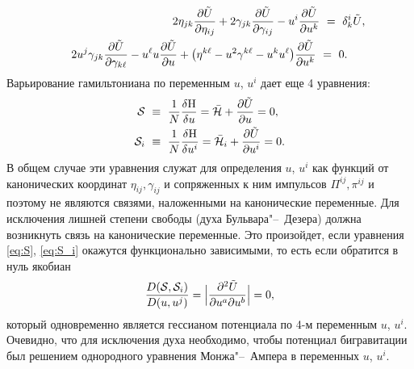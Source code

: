 \begin{gather}
\hspace{3.7cm}
 2\eta_{jk}\frac{\partial\tilde{U}}{\partial\eta_{ij}}+2\gamma_{jk}\frac{\partial\tilde{U}}{\partial\gamma_{ij}}-u^i\frac{\partial\tilde{U}}{\partial u^k}~=~\delta^i_k\tilde{U},%
 \\
 2u^j\gamma_{jk}\frac{\partial\tilde{U}}{\partial\gamma_{k\ell}}-u^\ell u\frac{\partial\tilde{U}}{\partial u}+\bigl(\eta^{k\ell}-u^2\gamma^{k\ell}-u^k u^\ell \bigr)\frac{\partial\tilde{U}}{\partial u^k}~=~0.\label{eq:pot2}
\end{gather}
Варьирование гамильтониана по переменным $u$, $u^i$ дает еще 4 уравнения: 
\begin{gather}
{\cal S}~\equiv~\frac{1}{N}\frac{\delta{\rm H}}{\delta u}= {\bar{\cal H}}+\frac{\partial\tilde{U}}{\partial u}=0,~
\label{eq:S}
\\
 {\cal S}_i~\equiv~\frac{1}{N}\frac{\delta{\rm H}}{\delta u^i}={\bar{\cal H}}_i+\frac{\partial\tilde{U}}{\partial u^i}=0.\label{eq:S_i}
\end{gather}
В общем случае эти уравнения служат для определения  $u$, $u^i$ как функций от канонических координат $\eta_{ij},\gamma_{ij}$ и сопряженных к ним импульсов $\Pi^{ij},\pi^{ij}$ и поэтому не являются связями, наложенными на канонические переменные. Для исключения лишней степени свободы (духа Бульвара"--~Дезера) должна возникнуть связь на канонические переменные. Это произойдет, если уравнения \eqref{eq:S}, \eqref{eq:S_i} окажутся функционально зависимыми, то есть если обратится в нуль якобиан
$$
\frac{D ({\cal S},{\cal S}_i)}{D (u,u^j)}=\Bigl|\frac{\partial^2 \tilde U}{\partial u^a\partial u^b}\Bigr|=0,
$$
который одновременно является гессианом потенциала по 4-м переменным $u$, $u^i$.
Очевидно, что для исключения духа необходимо, чтобы потенциал бигравитации был решением однородного уравнения 
Монжа"--~Ампера в переменных  $u$, $u^i$.

\smallskip

